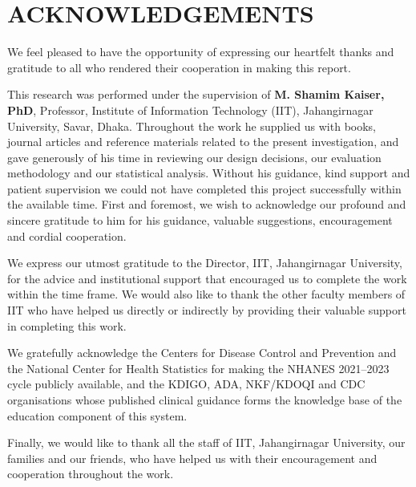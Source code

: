 \documentclass[12pt,a4paper,oneside]{report}
\begin{document}
\chapter*{ACKNOWLEDGEMENTS}
\thispagestyle{fancy}

We feel pleased to have the opportunity of expressing our heartfelt thanks and
gratitude to all who rendered their cooperation in making this report.

This research was performed under the supervision of \textbf{M. Shamim Kaiser,
PhD}, Professor, Institute of Information Technology (IIT), Jahangirnagar
University, Savar, Dhaka. Throughout the work he supplied us with books,
journal articles and reference materials related to the present investigation,
and gave generously of his time in reviewing our design decisions, our
evaluation methodology and our statistical analysis. Without his guidance, kind
support and patient supervision we could not have completed this project
successfully within the available time. First and foremost, we wish to
acknowledge our profound and sincere gratitude to him for his guidance,
valuable suggestions, encouragement and cordial cooperation.

We express our utmost gratitude to the Director, IIT, Jahangirnagar University,
for the advice and institutional support that encouraged us to complete the
work within the time frame. We would also like to thank the other faculty
members of IIT who have helped us directly or indirectly by providing their
valuable support in completing this work.

We gratefully acknowledge the Centers for Disease Control and Prevention and
the National Center for Health Statistics for making the NHANES 2021--2023
cycle publicly available, and the KDIGO, ADA, NKF/KDOQI and CDC organisations
whose published clinical guidance forms the knowledge base of the education
component of this system.

Finally, we would like to thank all the staff of IIT, Jahangirnagar University,
our families and our friends, who have helped us with their encouragement and
cooperation throughout the work.

\end{document}
